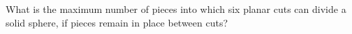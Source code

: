 What is the maximum number of pieces into which six planar cuts can divide a solid sphere, if pieces remain in place between cuts?
